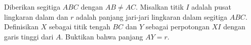 Diberikan segitiga $ABC$ dengan $AB \neq AC$. Misalkan titik $I$ adalah pusat lingkaran dalam dan $r$ adalah panjang jari-jari lingkaran dalam segitiga $ABC$. Definisikan $X$ sebagai titik tengah $BC$ dan $Y$ sebagai perpotongan $XI$ dengan garis tinggi dari $A$. Buktikan bahwa panjang $AY = r$.